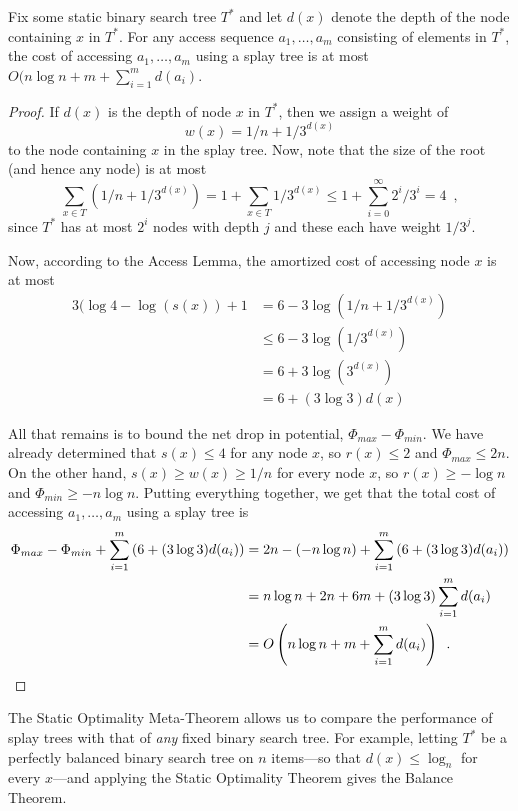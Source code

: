 {\begin{thm} 
Fix some static binary search tree $T^*$ and let $d(x)$ denote the depth
of the node containing $x$ in $T^*$. 
For any access sequence $a_1,\ldots,a_m$ consisting of elements in $T^*$,
the cost of accessing $a_1,\ldots,a_m$ using a splay tree is at most
$O(n\log n + m + \sum_{i=1}^m d(a_i)$.
\end{thm}

\begin{proof}
If $d(x)$ is the depth of node $x$ in $T^*$, then we assign a weight of
\[
   w(x)=1/n+1/3^{d(x)}
\]
to the node containing $x$ in the splay tree.  Now, note that the size of the root (and hence any node) is at most 
\[
    \sum_{x\in T}\left(1/n + 1/3^{d(x)}\right) = 
    1 + \sum_{x\in T}1/3^{d(x)} 
    \le 1 + \sum_{i=0}^\infty 2^i/3^i 
    = 4 \enspace ,
\]
since $T^*$ has at most $2^i$ nodes with depth $j$ and these each have
weight $1/3^j$. 

Now, according to the Access Lemma, the amortized cost of accessing node $x$ is
at most
\begin{align*}
    3(\log 4 - \log(s(x)) + 1 
    & = 6 - 3\log(1/n+1/3^{d(x)})  \\
    & \le 6 - 3\log(1/3^{d(x)})   \\
    & = 6 + 3\log(3^{d(x)})   \\
    & = 6 + (3\log 3)d(x) 
\end{align*}

All that remains is to bound the net drop in potential, $\Phi_{max}-\Phi_{min}$.
We have already determined that $s(x)\le 4$ for any node $x$, so $r(x)\le 2$ and $\Phi_{max} \le 2n$.  On the other hand, $s(x)\ge w(x)\ge 1/n$ for every node $x$, so $r(x)\ge -\log n$ and $\Phi_{min}\ge -n\log n$.  Putting everything together, we get that the total cost of accessing $a_1,\ldots,a_m$
using a splay tree is
\begin{align*}
   \Phi_{max} - \Phi_{min} + \sum_{i=1}^m \left(6 + (3\log 3)d(a_i)\right)
  & = 2n - (-n\log n) + \sum_{i=1}^m \left(6 + (3\log 3)d(a_i)\right) \\
  & = n\log n + 2n + 6m + (3\log 3)\sum_{i=1}^m d(a_i) \\
  & = O\left(n\log n + m + \sum_{i=1}^m d(a_i)\right) \enspace .\qedhere
\end{align*}
\end{proof}

The Static Optimality Meta-Theorem allows us to compare the performance
of splay trees with that of \emph{any} fixed binary search tree.
For example, letting $T^*$ be a perfectly balanced binary search tree
on $n$ items---so that $d(x)\le \log_n$ for every $x$---and applying
the Static Optimality Theorem gives the Balance Theorem.

}
